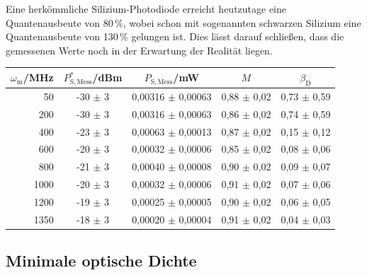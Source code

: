 Eine herkömmliche Silizium-Photodiode erreicht heutzutage eine Quantenausbeute von 80\,\%, wobei schon mit sogenannten schwarzen Silizium eine Quantenausbeute von 130\,\% gelungen ist. \cite{siPD} Dies lässt darauf schließen, dass die gemessenen Werte noch in der Erwartung der Realität liegen.
\begin{center}
    \captionsetup{type=table}
    \begin{tabular}{r | c c | c c}
        $\omega_\mathrm{m}$/MHz & $P^*_\mathrm{S,Mess}$/dBm & $P_\mathrm{S,Mess}$/mW & $M$ & $\beta_\mathrm{D}$\\ \hline
        50   & -30 $\pm$ 3 & 0,00316 $\pm$ 0,00063 & 0,88 $\pm$ 0,02 & 0,73 $\pm$ 0,59 \\
        200  & -30 $\pm$ 3 & 0,00316 $\pm$ 0,00063 & 0,86 $\pm$ 0,02 & 0,74 $\pm$ 0,59 \\
        400  & -23 $\pm$ 3 & 0,00063 $\pm$ 0,00013 & 0,87 $\pm$ 0,02 & 0,15 $\pm$ 0,12 \\
        600  & -20 $\pm$ 3 & 0,00032 $\pm$ 0,00006 & 0,85 $\pm$ 0,02 & 0,08 $\pm$ 0,06 \\
        800  & -21 $\pm$ 3 & 0,00040 $\pm$ 0,00008 & 0,90 $\pm$ 0,02 & 0,09 $\pm$ 0,07 \\
        1000 & -20 $\pm$ 3 & 0,00032 $\pm$ 0,00006 & 0,91 $\pm$ 0,02 & 0,07 $\pm$ 0,06 \\
        1200 & -19 $\pm$ 3 & 0,00025 $\pm$ 0,00005 & 0,90 $\pm$ 0,02 & 0,06 $\pm$ 0,05 \\
        1350 & -18 $\pm$ 3 & 0,00020 $\pm$ 0,00004 & 0,91 $\pm$ 0,02 & 0,04 $\pm$ 0,03 \\
    \end{tabular}
    \label{tab:ausbeute}
\end{center}

\subsection{Minimale optische Dichte}
\label{sub:minopDichte}

